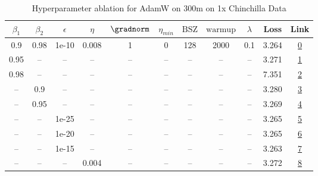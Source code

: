 \begin{table}[H]
\centering
\caption{Hyperparameter ablation for AdamW on 300m on 1x Chinchilla Data}
\label{tab:ablation_adamw_300m_on_1x_chinchilla_data}
\begin{tabular}{ccccccccccc}
\toprule
$\beta_1$ & $\beta_2$ & $\epsilon$ & $\eta$ & $\gradnorm$ & $\eta_{min}$ & $\mathrm{BSZ}$ & $\mathrm{warmup}$ & $\lambda$ & Loss & Link \\
\midrule
0.9 & 0.98 & 1e-10 & 0.008 & 1 & 0 & 128 & 2000 & 0.1 & 3.264 & \href{https://wandb.ai/stanford-mercury/optimizer-scaling/runs/sweep-300m-6B-adamwa7aafelr0.008-wd0.1-minlr0-warmup2000-b10.9-b-990eda}{0} \\
\midrule
0.95 & -- & -- & -- & -- & -- & -- & -- & -- & 3.271 & \href{https://wandb.ai/stanford-mercury/optimizer-scaling/runs/sweep-300m-6B-adamw55fc1flr0.008-wd0.1-minlr0-warmup2000-b10.95--b7196b}{1} \\
0.98 & -- & -- & -- & -- & -- & -- & -- & -- & 7.351 & \href{https://wandb.ai/stanford-mercury/optimizer-scaling/runs/sweep-300m-6B-adamw3aa56elr0.008-wd0.1-minlr0-warmup2000-b10.98--36a5e7}{2} \\
-- & 0.9 & -- & -- & -- & -- & -- & -- & -- & 3.280 & \href{https://wandb.ai/stanford-mercury/optimizer-scaling/runs/sweep-300m-6B-adamw72a6d2lr0.008-wd0.1-minlr0-warmup2000-b10.9-b-dde1e5}{3} \\
-- & 0.95 & -- & -- & -- & -- & -- & -- & -- & 3.269 & \href{https://wandb.ai/stanford-mercury/optimizer-scaling/runs/sweep-300m-6B-adamw901abclr0.008-wd0.1-minlr0-warmup2000-b10.9-b-de77a3}{4} \\
-- & -- & 1e-25 & -- & -- & -- & -- & -- & -- & 3.265 & \href{https://wandb.ai/stanford-mercury/optimizer-scaling/runs/sweep-300m-6B-adamwfa0d44lr0.008-wd0.1-minlr0-warmup2000-b10.9-b-89eba9}{5} \\
-- & -- & 1e-20 & -- & -- & -- & -- & -- & -- & 3.265 & \href{https://wandb.ai/stanford-mercury/optimizer-scaling/runs/sweep-300m-6B-adamw057b30lr0.008-wd0.1-minlr0-warmup2000-b10.9-b-cff503}{6} \\
-- & -- & 1e-15 & -- & -- & -- & -- & -- & -- & 3.263 & \href{https://wandb.ai/stanford-mercury/optimizer-scaling/runs/sweep-300m-6B-adamw863e5alr0.008-wd0.1-minlr0-warmup2000-b10.9-b-8395a7}{7} \\
-- & -- & -- & 0.004 & -- & -- & -- & -- & -- & 3.272 & \href{https://wandb.ai/stanford-mercury/optimizer-scaling/runs/sweep-300m-6B-adamw0c32aelr0.004-wd0.1-minlr0-warmup2000-b10.9-b-a044c7}{8} \\

\end{tabular}
\end{table}
